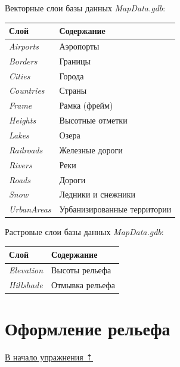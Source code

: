 \documentclass[12pt,]{book}
\begin{document}
Векторные слои базы данных \emph{MapData.gdb}:

\begin{longtable}[]{@{}ll@{}}
\toprule
Слой & Содержание\tabularnewline
\midrule
\endhead
\emph{Airports} & Аэропорты\tabularnewline
\emph{Borders} & Границы\tabularnewline
\emph{Cities} & Города\tabularnewline
\emph{Countries} & Страны\tabularnewline
\emph{Frame} & Рамка (фрейм)\tabularnewline
\emph{Heights} & Высотные отметки\tabularnewline
\emph{Lakes} & Озера\tabularnewline
\emph{Railroads} & Железные дороги\tabularnewline
\emph{Rivers} & Реки\tabularnewline
\emph{Roads} & Дороги\tabularnewline
\emph{Snow} & Ледники и снежники\tabularnewline
\emph{UrbanAreas} & Урбанизированные территории\tabularnewline
\bottomrule
\end{longtable}

Растровые слои базы данных \emph{MapData.gdb}:

\begin{longtable}[]{@{}ll@{}}
\toprule
Слой & Содержание\tabularnewline
\midrule
\endhead
\emph{Elevation} & Высоты рельефа\tabularnewline
\emph{Hillshade} & Отмывка рельефа\tabularnewline
\bottomrule
\end{longtable}

\hypertarget{map-design-general-relief}{%
\section{Оформление рельефа}\label{map-design-general-relief}}

\protect\hyperlink{map-design-general}{В начало упражнения ⇡}
\end{document}

